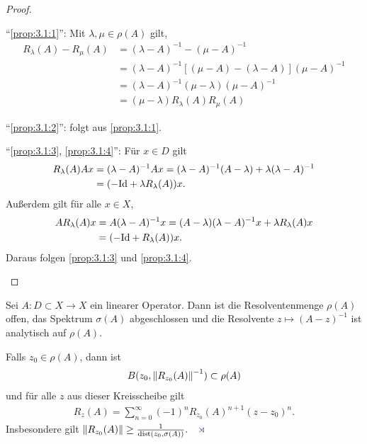 \begin{proof}
\begin{proofenum}
``\ref{prop:3.1:1}'':
Mit $\lambda,\mu \in \rho(A)$ gilt,
\begin{align*}
R_{\lambda}(A)-R_{\mu}(A) & = (\lambda-A)^{-1} - (\mu-A)^{-1}\\
& = (\lambda-A)^{-1} \left[(\mu-A)-(\lambda-A)\right] (\mu-A)^{-1}\\
& = (\lambda-A)^{-1} (\mu-\lambda) (\mu-A)^{-1}\\
& = (\mu-\lambda) R_{\lambda}(A)R_{\mu}(A)
\end{align*}

``\ref{prop:3.1:2}'':
folgt aus \ref{prop:3.1:1}.

``\ref{prop:3.1:3}, \ref{prop:3.1:4}'':
Für $x \in D$ gilt
\begin{align*}
R_{\lambda}(A) Ax & =
(\lambda-A)^{-1}Ax  = (\lambda-A)^{-1}(A-\lambda) + \lambda(\lambda-A)^{-1}\\
&= (-\mathrm{Id}+\lambda R_\lambda(A))x. 
\end{align*}
Außerdem gilt für alle $x \in X$,
\begin{align*}
A R_{\lambda}(A)x & = A(\lambda-A)^{-1}x
= (A-\lambda)(\lambda-A)^{-1}x + \lambda R_\lambda(A)x\\
&= (-\mathrm{Id} + R_\lambda(A))x. 
\end{align*}
Daraus folgen \ref{prop:3.1:3} und \ref{prop:3.1:4}.\qedhere
\end{proofenum}
\end{proof}

\begin{thm}
\label{prop:3.2}
Sei $A : D \subset X \to X$
ein linearer Operator. Dann ist die Resolventenmenge $\rho(A)$ offen,
das Spektrum $\sigma(A)$ abgeschlossen und die Resolvente $z \mapsto
(A-z)^{-1}$ ist analytisch auf $\rho(A)$.

Falls $z_0 \in \rho(A)$, dann ist
\begin{align*}
B(z_0,\left\|R_{z_0}(A)\right\|^{-1}) \subset \rho(A)
\end{align*}
und für alle $z$ aus dieser Kreisscheibe gilt
\begin{align*}
R_z(A) = \sum_{n=0}^{\infty} (-1)^nR_{z_0}(A)^{n+1}(z-z_0)^n.
\end{align*}
Insbesondere gilt
$
\norm{R_{z_0}(A)} \geq \frac{1}{\dist(z_0,\sigma(A))}.\fishhere
$
\end{thm}

